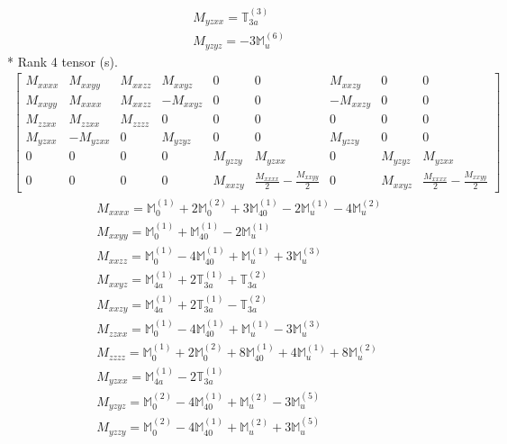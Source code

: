 \documentclass[fleqn,8pt,landscape]{jsarticle}
\begin{document}
\begin{align*}
& M_{yzxx} = \mathbb{T}_{3a}^{(3)} \\
& M_{yzyz} = - 3 \mathbb{M}_{u}^{(6)}
\end{align*}
* Rank 4 tensor (s).
\begin{align*}
\begin{bmatrix} M_{xxxx} & M_{xxyy} & M_{xxzz} & M_{xxyz} & 0 & 0 & M_{xxzy} & 0 & 0 \\ M_{xxyy} & M_{xxxx} & M_{xxzz} & - M_{xxyz} & 0 & 0 & - M_{xxzy} & 0 & 0 \\ M_{zzxx} & M_{zzxx} & M_{zzzz} & 0 & 0 & 0 & 0 & 0 & 0 \\ M_{yzxx} & - M_{yzxx} & 0 & M_{yzyz} & 0 & 0 & M_{yzzy} & 0 & 0 \\ 0 & 0 & 0 & 0 & M_{yzzy} & M_{yzxx} & 0 & M_{yzyz} & M_{yzxx} \\ 0 & 0 & 0 & 0 & M_{xxzy} & \frac{M_{xxxx}}{2} - \frac{M_{xxyy}}{2} & 0 & M_{xxyz} & \frac{M_{xxxx}}{2} - \frac{M_{xxyy}}{2} \end{bmatrix}
\end{align*}
\begin{align*}
& M_{xxxx} = \mathbb{M}_{0}^{(1)} + 2 \mathbb{M}_{0}^{(2)} + 3 \mathbb{M}_{40}^{(1)} - 2 \mathbb{M}_{u}^{(1)} - 4 \mathbb{M}_{u}^{(2)} \\
& M_{xxyy} = \mathbb{M}_{0}^{(1)} + \mathbb{M}_{40}^{(1)} - 2 \mathbb{M}_{u}^{(1)} \\
& M_{xxzz} = \mathbb{M}_{0}^{(1)} - 4 \mathbb{M}_{40}^{(1)} + \mathbb{M}_{u}^{(1)} + 3 \mathbb{M}_{u}^{(3)} \\
& M_{xxyz} = \mathbb{M}_{4a}^{(1)} + 2 \mathbb{T}_{3a}^{(1)} + \mathbb{T}_{3a}^{(2)} \\
& M_{xxzy} = \mathbb{M}_{4a}^{(1)} + 2 \mathbb{T}_{3a}^{(1)} - \mathbb{T}_{3a}^{(2)} \\
& M_{zzxx} = \mathbb{M}_{0}^{(1)} - 4 \mathbb{M}_{40}^{(1)} + \mathbb{M}_{u}^{(1)} - 3 \mathbb{M}_{u}^{(3)} \\
& M_{zzzz} = \mathbb{M}_{0}^{(1)} + 2 \mathbb{M}_{0}^{(2)} + 8 \mathbb{M}_{40}^{(1)} + 4 \mathbb{M}_{u}^{(1)} + 8 \mathbb{M}_{u}^{(2)} \\
& M_{yzxx} = \mathbb{M}_{4a}^{(1)} - 2 \mathbb{T}_{3a}^{(1)} \\
& M_{yzyz} = \mathbb{M}_{0}^{(2)} - 4 \mathbb{M}_{40}^{(1)} + \mathbb{M}_{u}^{(2)} - 3 \mathbb{M}_{u}^{(5)} \\
& M_{yzzy} = \mathbb{M}_{0}^{(2)} - 4 \mathbb{M}_{40}^{(1)} + \mathbb{M}_{u}^{(2)} + 3 \mathbb{M}_{u}^{(5)}
\end{align*}
\end{document}
